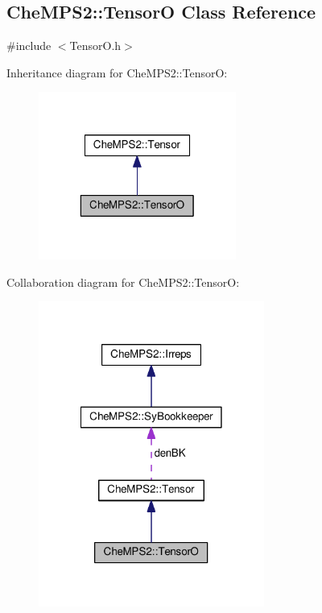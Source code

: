 \hypertarget{classCheMPS2_1_1TensorO}{\subsection{Che\-M\-P\-S2\-:\-:Tensor\-O Class Reference}
\label{classCheMPS2_1_1TensorO}
}


{\ttfamily \#include $<$Tensor\-O.\-h$>$}



Inheritance diagram for Che\-M\-P\-S2\-:\-:Tensor\-O\-:\nopagebreak
\begin{figure}[H]
\begin{center}
\leavevmode
\includegraphics[width=184pt]{classCheMPS2_1_1TensorO__inherit__graph}
\end{center}
\end{figure}


Collaboration diagram for Che\-M\-P\-S2\-:\-:Tensor\-O\-:\nopagebreak
\begin{figure}[H]
\begin{center}
\leavevmode
\includegraphics[width=210pt]{classCheMPS2_1_1TensorO__coll__graph}
\end{center}
\end{figure}
